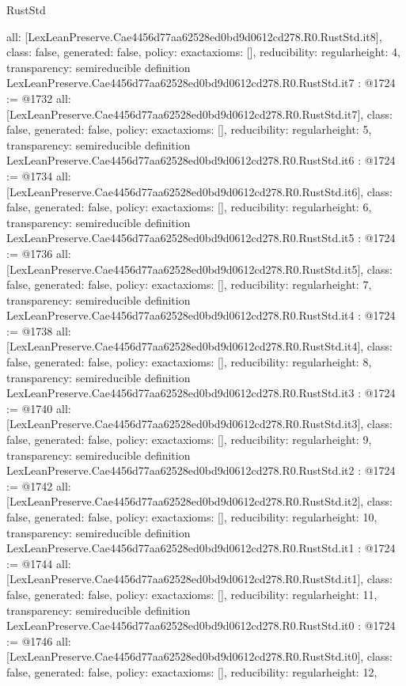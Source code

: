 \begin{lexlean}{RustStd}
\begin{coremodule}
{  all: [LexLeanPreserve.Cae4456d77aa62528ed0bd9d0612cd278.R0.RustStd.it8],
  class: false,
  generated: false,
  policy: exact{axioms: []},
  reducibility: regular{height: 4},
  transparency: semireducible
}
definition LexLeanPreserve.Cae4456d77aa62528ed0bd9d0612cd278.R0.RustStd.it7 : @1724 := @1732 {
  all: [LexLeanPreserve.Cae4456d77aa62528ed0bd9d0612cd278.R0.RustStd.it7],
  class: false,
  generated: false,
  policy: exact{axioms: []},
  reducibility: regular{height: 5},
  transparency: semireducible
}
definition LexLeanPreserve.Cae4456d77aa62528ed0bd9d0612cd278.R0.RustStd.it6 : @1724 := @1734 {
  all: [LexLeanPreserve.Cae4456d77aa62528ed0bd9d0612cd278.R0.RustStd.it6],
  class: false,
  generated: false,
  policy: exact{axioms: []},
  reducibility: regular{height: 6},
  transparency: semireducible
}
definition LexLeanPreserve.Cae4456d77aa62528ed0bd9d0612cd278.R0.RustStd.it5 : @1724 := @1736 {
  all: [LexLeanPreserve.Cae4456d77aa62528ed0bd9d0612cd278.R0.RustStd.it5],
  class: false,
  generated: false,
  policy: exact{axioms: []},
  reducibility: regular{height: 7},
  transparency: semireducible
}
definition LexLeanPreserve.Cae4456d77aa62528ed0bd9d0612cd278.R0.RustStd.it4 : @1724 := @1738 {
  all: [LexLeanPreserve.Cae4456d77aa62528ed0bd9d0612cd278.R0.RustStd.it4],
  class: false,
  generated: false,
  policy: exact{axioms: []},
  reducibility: regular{height: 8},
  transparency: semireducible
}
definition LexLeanPreserve.Cae4456d77aa62528ed0bd9d0612cd278.R0.RustStd.it3 : @1724 := @1740 {
  all: [LexLeanPreserve.Cae4456d77aa62528ed0bd9d0612cd278.R0.RustStd.it3],
  class: false,
  generated: false,
  policy: exact{axioms: []},
  reducibility: regular{height: 9},
  transparency: semireducible
}
definition LexLeanPreserve.Cae4456d77aa62528ed0bd9d0612cd278.R0.RustStd.it2 : @1724 := @1742 {
  all: [LexLeanPreserve.Cae4456d77aa62528ed0bd9d0612cd278.R0.RustStd.it2],
  class: false,
  generated: false,
  policy: exact{axioms: []},
  reducibility: regular{height: 10},
  transparency: semireducible
}
definition LexLeanPreserve.Cae4456d77aa62528ed0bd9d0612cd278.R0.RustStd.it1 : @1724 := @1744 {
  all: [LexLeanPreserve.Cae4456d77aa62528ed0bd9d0612cd278.R0.RustStd.it1],
  class: false,
  generated: false,
  policy: exact{axioms: []},
  reducibility: regular{height: 11},
  transparency: semireducible
}
definition LexLeanPreserve.Cae4456d77aa62528ed0bd9d0612cd278.R0.RustStd.it0 : @1724 := @1746 {
  all: [LexLeanPreserve.Cae4456d77aa62528ed0bd9d0612cd278.R0.RustStd.it0],
  class: false,
  generated: false,
  policy: exact{axioms: []},
  reducibility: regular{height: 12},
}
\end{coremodule}
\end{lexlean}

